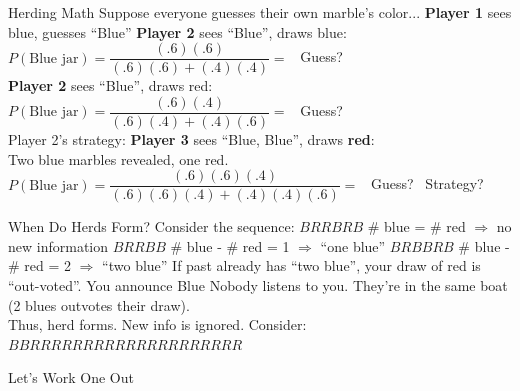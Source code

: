\begin{frame}{Herding Math}
Suppose everyone guesses their own marble's color...
\bsk
\textbf{Player 1} sees blue, guesses ``Blue''
\bsk
\textbf{Player 2} sees ``Blue'', draws blue:\\
$P(\text{Blue jar})=\dfrac{(.6)(.6)}{(.6)(.6)+(.4)(.4)}=$  \ Guess? \\
\textbf{Player 2} sees ``Blue'', draws red:\\
$P(\text{Blue jar})=\dfrac{(.6)(.4)}{(.6)(.4)+(.4)(.6)}=$  \ Guess? \\
Player 2's strategy: 
\bsk
\textbf{Player 3} sees ``Blue, Blue'', draws \textbf{red}:\\
Two blue marbles revealed, one red. $P(\text{Blue jar})=\dfrac{(.6)(.6)(.4)}{(.6)(.6)(.4)+(.4)(.4)(.6)}=$  \ Guess?  \ Strategy? 
\bsk
{}
\vspace{-0.2in}
\end{frame}

\begin{frame}{When Do Herds Form?}
Consider the sequence:
\bsk
$BRRBRB$ \quad \# blue =  \# red $\Rightarrow$ no new information
\bsk
$BRRBB$ \quad \# blue - \# red = 1 $\Rightarrow$ ``one blue''
\bsk
$BRBBRB$ \quad \# blue - \# red = 2 $\Rightarrow$ ``two blue''
\bsk
If past already has ``two blue'', your draw of red is ``out-voted''. You announce Blue
\bsk
Nobody listens to you. They're in the same boat (2 blues outvotes their draw).\\
Thus, herd forms. New info is ignored.
\bsk
Consider:\\
$BBRRRRRRRRRRRRRRRRRRRR$
    
\end{frame}


\begin{frame}[standout]
Let's Work One Out
\end{frame}

